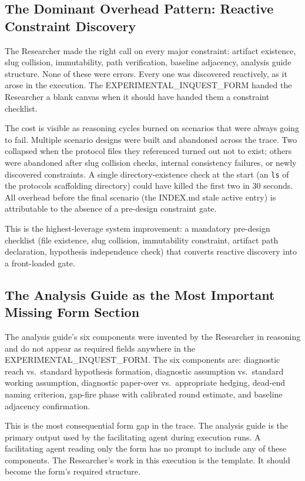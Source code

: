 \documentclass[11pt,a4paper]{article}
\begin{document}
\subsection{The Dominant Overhead Pattern: Reactive Constraint Discovery}

The Researcher made the right call on every major constraint: artifact
existence, slug collision, immutability, path verification, baseline adjacency,
analysis guide structure. None of these were errors. Every one was discovered
reactively, as it arose in the execution. The EXPERIMENTAL\_INQUEST\_FORM
handed the Researcher a blank canvas when it should have handed them a
constraint checklist.

The cost is visible as reasoning cycles burned on scenarios that were always
going to fail. Multiple scenario designs were built and abandoned across the
trace. Two collapsed when the protocol files they referenced turned out not to
exist; others were abandoned after slug collision checks, internal consistency
failures, or newly discovered constraints. A single directory-existence check at
the start (an \texttt{ls} of the protocols scaffolding directory) could have
killed the first two in 30 seconds. All overhead before the final scenario (the INDEX.md
stale active entry) is attributable to the absence of a pre-design constraint
gate.

This is the highest-leverage system improvement: a mandatory pre-design
checklist (file existence, slug collision, immutability constraint, artifact
path declaration, hypothesis independence check) that converts reactive
discovery into a front-loaded gate.

\subsection{The Analysis Guide as the Most Important Missing Form Section}

The analysis guide's six components were invented by the Researcher in
reasoning and do not appear as required fields anywhere in the
EXPERIMENTAL\_INQUEST\_FORM. The six components are: diagnostic reach vs.\
standard hypothesis formation, diagnostic assumption vs.\ standard working
assumption, diagnostic paper-over vs.\ appropriate hedging, dead-end naming
criterion, gap-fire phase with calibrated round estimate, and baseline
adjacency confirmation.

This is the most consequential form gap in the trace. The analysis guide is the
primary output used by the facilitating agent during execution runs. A
facilitating agent reading only the form has no prompt to include any of these
components. The Researcher's work in this execution is the template. It should
become the form's required structure.
\end{document}
